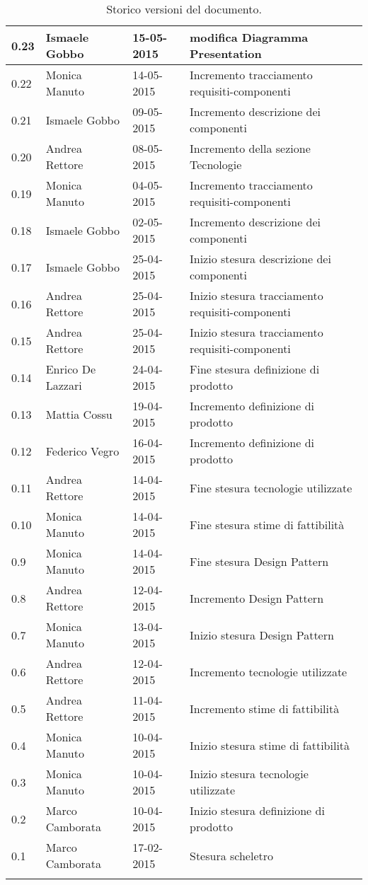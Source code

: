 \begin{longtable}{|l|l|l|p{}|}
\hline
0.23 & Ismaele Gobbo & 15-05-2015 & modifica Diagramma Presentation \\
\hline
0.22 & Monica Manuto & 14-05-2015 & Incremento tracciamento requisiti-componenti \\
\hline
0.21 & Ismaele Gobbo & 09-05-2015 & Incremento descrizione dei componenti \\
\hline
0.20 & Andrea Rettore & 08-05-2015 & Incremento della sezione Tecnologie \\
\hline
0.19 & Monica Manuto & 04-05-2015 & Incremento tracciamento requisiti-componenti \\
\hline
0.18 & Ismaele Gobbo & 02-05-2015 & Incremento descrizione dei componenti \\
\hline
0.17 & Ismaele Gobbo & 25-04-2015 & Inizio stesura descrizione dei componenti \\
\hline
0.16 & Andrea Rettore & 25-04-2015 & Inizio stesura tracciamento requisiti-componenti \\
\hline
0.15 & Andrea Rettore & 25-04-2015 & Inizio stesura tracciamento requisiti-componenti \\
\hline
0.14 & Enrico De Lazzari & 24-04-2015 & Fine stesura definizione di prodotto \\
\hline
0.13 & Mattia Cossu & 19-04-2015 & Incremento definizione di prodotto \\
\hline
0.12 & Federico Vegro & 16-04-2015 & Incremento definizione di prodotto \\
\hline
0.11 & Andrea Rettore & 14-04-2015 & Fine stesura tecnologie utilizzate \\
\hline
0.10 & Monica Manuto & 14-04-2015 & Fine stesura stime di fattibilità \\
\hline
0.9 & Monica Manuto & 14-04-2015 & Fine stesura Design Pattern \\
\hline
0.8 & Andrea Rettore & 12-04-2015 & Incremento Design Pattern \\
\hline
0.7 & Monica Manuto & 13-04-2015 & Inizio stesura Design Pattern \\
\hline
0.6 & Andrea Rettore & 12-04-2015 & Incremento tecnologie utilizzate \\
\hline
0.5 & Andrea Rettore & 11-04-2015 & Incremento stime di fattibilità \\
\hline
0.4 & Monica Manuto & 10-04-2015 & Inizio stesura stime di fattibilità \\
\hline
0.3 & Monica Manuto & 10-04-2015 & Inizio stesura tecnologie utilizzate \\
\hline
0.2 & Marco Camborata & 10-04-2015 & Inizio stesura definizione di prodotto \\
\hline
0.1 & Marco Camborata & 17-02-2015 & Stesura scheletro \\
\hline
\caption{Storico versioni del documento.}
\end{longtable}
